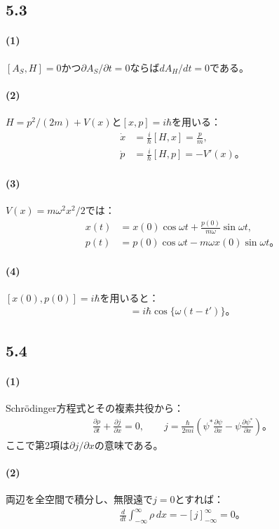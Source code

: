 \documentclass[platex,dvipdfmx,a4paper]{jsarticle}
\newcommand{\hb}[2]{\frac{\partial #1}{\partial #2}}
\newcommand{\bbn}[2]{\frac{d #1}{d #2}}
\begin{document}
\subsection*{5.3}
\paragraph{(1)} $[A_S,H]=0$かつ$\partial A_S/\partial t=0$ならば$dA_H/dt=0$である。
\paragraph{(2)} $H=p^2/(2m)+V(x)$と$[x,p]=i\hbar$を用いる：
\begin{align*}
 \dot x&=\frac{i}{\hbar}[H,x]=\frac pm,\\
 \dot p&=\frac{i}{\hbar}[H,p]=-V'(x)。
\end{align*}
\paragraph{(3)} $V(x)=m\omega^2x^2/2$では：
\begin{align*}
 x(t)&=x(0)\cos\omega t+\frac{p(0)}{m\omega}\sin\omega t,\\
 p(t)&=p(0)\cos\omega t-m\omega x(0)\sin\omega t。
\end{align*}
\paragraph{(4)} $[x(0),p(0)]=i\hbar$を用いると：
\begin{align*}
 [x(t),p(t')]=i\hbar\cos\{\omega(t-t')\}。
\end{align*}
\subsection*{5.4}
\paragraph{(1)} Schrödinger方程式とその複素共役から：
\begin{align*}
 \hb{\rho}{t}+\hb{j}{x}=0,
 \qquad
 j=\frac{\hbar}{2mi}\left(\psi^*\hb\psi x-\psi\hb{\psi^*}x\right)。
\end{align*}
ここで第2項は$\partial j/\partial x$の意味である。
\paragraph{(2)} 両辺を全空間で積分し、無限遠で$j=0$とすれば：
\begin{align*}
 \bbn{}{t}\int_{-\infty}^{\infty}\rho\,dx=-[j]_{-\infty}^{\infty}=0。
\end{align*}
\end{document}
